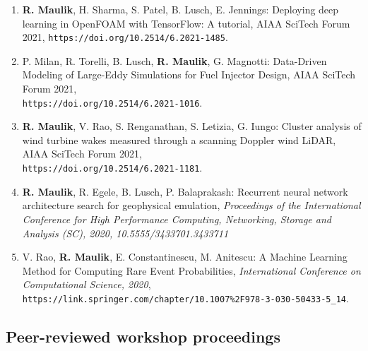 \documentclass[letterpaper]{article}
\begin{document}
\begin{enumerate}

\item \textbf{R. Maulik}, H. Sharma, S. Patel, B. Lusch, E. Jennings: Deploying deep learning in OpenFOAM with TensorFlow: A tutorial, AIAA SciTech Forum 2021, \texttt{https://doi.org/10.2514/6.2021-1485}.

\item P. Milan, R. Torelli, B. Lusch, \textbf{R. Maulik}, G. Magnotti: Data-Driven Modeling of Large-Eddy Simulations for Fuel Injector Design, AIAA SciTech Forum 2021, \\ \texttt{https://doi.org/10.2514/6.2021-1016}.

\item \textbf{R. Maulik}, V. Rao, S. Renganathan, S. Letizia, G. Iungo: Cluster analysis of wind turbine wakes measured through a scanning Doppler wind LiDAR, AIAA SciTech Forum 2021, \\ \texttt{https://doi.org/10.2514/6.2021-1181}.

\item \textbf{R. Maulik}, R. Egele, B. Lusch,  P. Balaprakash: Recurrent neural network architecture search for geophysical emulation, {\it Proceedings of the International Conference for High Performance Computing, Networking, Storage and Analysis (SC), 2020, 10.5555/3433701.3433711}

\item V. Rao, \textbf{R. Maulik}, E. Constantinescu, M. Anitescu: A Machine Learning Method for Computing Rare Event Probabilities, {\it International Conference on Computational Science, 2020}, \\ \texttt{https://link.springer.com/chapter/10.1007\%2F978-3-030-50433-5\_14}.

\end{enumerate}


\subsection*{Peer-reviewed workshop proceedings}
\end{document}
